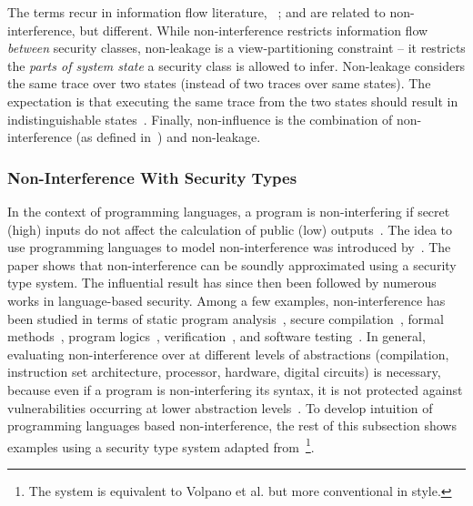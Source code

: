The terms recur in information flow literature, \eg~\cite{nelson2020,ileri2024};
and are related to {non-interference}, but different.
While non-interference restricts information flow \emph{between} security classes,
{{non-leakage}} is a view-partitioning constraint --
it restricts the \emph{parts of system state} a security class is allowed to infer.
Non-leakage considers the same trace over two states (instead of two traces over same states).
The expectation is that executing the same trace from the two states should result in indistinguishable states~\cite{nelson2020}.
Finally, {{non-influence}} is the combination of non-interference (as defined in~\cite{rushby1992}) and non-leakage.

\subsubsection{Non-Interference With Security Types}
\label{sec-types}

In the context of programming languages, a program is {non-interfering} if 
{secret (high) inputs} do not affect the calculation of {public (low) outputs}~\cite{sabelfeld2003}.
The idea to use programming languages to model {non-interference} was introduced by~\textcite{volpanoI1996}.
The paper shows that {non-interference} can be soundly approximated using a {security type system}.
The influential result has since then been followed by numerous works in language-based security.
Among a few examples, {non-interference} has been studied in terms of
static program analysis~\cite{barthe2007,huang2014},
{secure compilation}~\cite{patrignani2017,myers1999,cecchetti2017},
formal methods~\cite{kammuller2008,nelson2020},
program logics~\cite{frumin2021,karbyshev2018,garg2006,beringer2007},
verification~\cite{eilers2023},
and software {testing}~\cite{hritcu2013}.
In general, evaluating {non-interference} over at different levels of abstractions
(compilation, instruction set architecture, processor, hardware, digital circuits) is necessary,
because even if a program is {non-interfering} \wrt its syntax,
it is not protected against vulnerabilities occurring at lower abstraction levels~\cite{piessens2024}.
To develop intuition of programming languages based {non-interference},
the rest of this subsection shows examples using {a security type system} adapted from~\cite{sabelfeld2003}\footnote{
The system is equivalent to Volpano et al. but more conventional in style.}.

